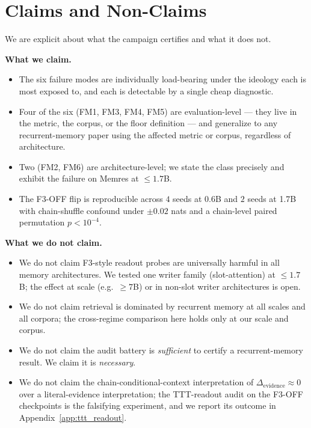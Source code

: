 \documentclass{article}
\newcommand{\elift}{\Delta_{\mathrm{evidence}}}
\begin{document}
\section{Claims and Non-Claims}
\label{sec:claims}

We are explicit about what the campaign certifies and what it does
not.

\textbf{What we claim.}
\begin{itemize}\setlength{\itemsep}{0.5pt}
\item The six failure modes are individually load-bearing under the
ideology each is most exposed to, and each is detectable by a single
cheap diagnostic.
\item Four of the six (FM1, FM3, FM4, FM5) are evaluation-level ---
they live in the metric, the corpus, or the floor definition --- and
generalize to any recurrent-memory paper using the affected metric or
corpus, regardless of architecture.
\item Two (FM2, FM6) are architecture-level; we state the class
precisely and exhibit the failure on Memres at $\le 1.7$B.
\item The F3-OFF flip is reproducible across $4$ seeds at 0.6B and
$2$ seeds at 1.7B with chain-shuffle confound under $\pm 0.02$ nats
and a chain-level paired permutation $p < 10^{-4}$.
\end{itemize}

\textbf{What we do not claim.}
\begin{itemize}\setlength{\itemsep}{0.5pt}
\item We do not claim F3-style readout probes are universally
harmful in all memory architectures.  We tested one writer family
(slot-attention) at $\le 1.7$B; the effect at scale (e.g.\ $\ge 7$B)
or in non-slot writer architectures is open.
\item We do not claim retrieval is dominated by recurrent memory at
all scales and all corpora; the cross-regime comparison here holds
only at our scale and corpus.
\item We do not claim the audit battery is \emph{sufficient} to
certify a recurrent-memory result.  We claim it is \emph{necessary}.
\item We do not claim the chain-conditional-context interpretation
of $\elift \approx 0$ over a literal-evidence interpretation; the
TTT-readout audit on the F3-OFF checkpoints is the falsifying
experiment, and we report its outcome in
Appendix~\ref{app:ttt_readout}.
\end{itemize}
\end{document}
